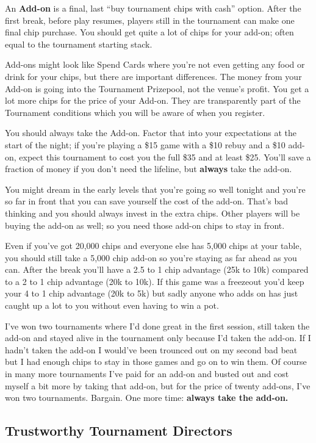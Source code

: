 An \textbf{Add-on} is a final, last ``buy tournament chips with cash''
option. After the first break, before play resumes, players still
in the tournament can make one final chip purchase. You should get
quite a lot of chips for your add-on; often equal to the tournament
starting stack.

Add-ons might look like Spend Cards where you're not even
getting any food or drink for your chips, but there are important
differences. The money from your Add-on is going into the Tournament
Prizepool, not the venue's profit. You get a lot more chips for
the price of your Add-on. They are transparently part of the
Tournament conditions which you will be aware of when you register.

You should always take the Add-on. Factor that into your expectations
at the start of the night; if you're playing a \$15 game with a \$10
rebuy and a \$10 add-on, expect this tournament to cost you the full
\$35 and at least \$25. You'll save a fraction of money if you don't
need the lifeline, but \textbf{always} take the add-on.

You might dream in the early levels that you're going so well
tonight and you're so far in front that you can save yourself
the cost of the add-on. That's bad thinking and you should always
invest in the extra chips. Other players will be buying the add-on
as well; so you need those add-on chips to stay in front.

Even if you've got 20,000 chips and everyone else has 5,000 chips at
your table, you should still take a 5,000 chip add-on so you're staying
as far ahead as you can. After the break you'll have a 2.5 to 1 chip
advantage (25k to 10k) compared to a 2 to 1 chip advantage (20k to 10k).
If this game was a freezeout you'd keep your 4 to 1 chip advantage
(20k to 5k) but sadly anyone who adds on has just caught up a lot to you
without even having to win a pot.

I've won two tournaments where I'd done great in the first session,
still taken the add-on and stayed alive in the tournament only because
I'd taken the add-on. If I hadn't taken the add-on I would've been
trounced out on my second bad beat but I had enough chips to stay in
those games and go on to win them. Of course in many more tournaments
I've paid for an add-on and busted out and cost myself a bit more by
taking that add-on, but for the price of twenty add-ons, I've won two
tournaments. Bargain. One more time: \textbf{always take the add-on.}

\subsection*{Trustworthy Tournament Directors}


